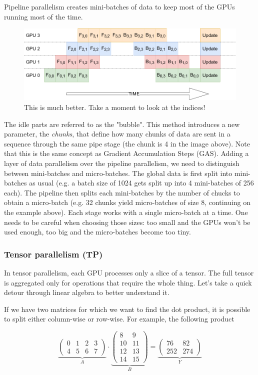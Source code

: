 \documentclass{article}
\begin{document}
Pipeline parallelism creates mini-batches of data to keep most of the GPUs running most of the time.

\begin{figure}[h!]
  \center
  \includegraphics[width=0.7\linewidth]{images/2022-08-25-09-22-51.png}
  \caption{This is much better. Take a moment to look at the indices!}
\end{figure}
\FloatBarrier

The idle parts are referred to as the "bubble". This method introduces a new parameter, the \textit{chunks}, that define how many chunks of data are sent in a sequence through the same pipe stage (the chunk is 4 in the image above). Note that this is the same concept as Gradient Accumulation Steps (\Gls{GAS}). Adding a layer of data parallelism over the pipeline parallelism, we need to distinguish between mini-batches and micro-batches. The global data is first split into mini-batches as usual (e.g. a batch size of 1024 gets split up into 4 mini-batches of 256 each). The pipeline then splits each mini-batches by the number of chucks to obtain a micro-batch (e.g. 32 chunks yield micro-batches of size 8, continuing on the example above). Each stage works with a single micro-batch at a time. One needs to be careful when choosing those sizes: too small and the GPUs won't be used enough, too big and the micro-batches become too tiny.

\subsubsection{Tensor parallelism (TP)}
In tensor parallelism, each GPU processes only a slice of a tensor. The full tensor is aggregated only for operations that require the whole thing. Let's take a quick detour through linear algebra to better understand it.

If we have two matrices for which we want to find the dot product, it is possible to split either column-wise or row-wise. For example, the following product

\[\underbrace{\begin{pmatrix}
0 & 1 & 2 & 3\\
4 & 5 & 6 & 7
\end{pmatrix}}_{A}\cdot \underbrace{\begin{pmatrix}
8 & 9\\
10 & 11\\
12 & 13\\
14 & 15
\end{pmatrix}}_{B}=\underbrace{\begin{pmatrix}
76 & 82\\
252 & 274
\end{pmatrix}}_{Y}\]
\end{document}
